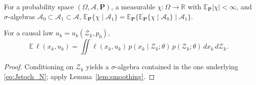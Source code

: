 \documentclass[twocolumn,amsthm]{autart}
\begin{document}
\begin{lem}\label{lem:smoothing}
For a probability space $(\Omega,\mathcal{A},\mathbf{P})$, a measurable
$\chi:\Omega\to\mathbb{R}$ with $\mathbb{E}_{\mathbf P}|\chi|<\infty$, and
$\sigma$-algebras $\mathcal{A}_0 \subset \mathcal{A}_1 \subset \mathcal{A}$,
$\mathbb{E}_{\mathbf P}\{\chi \mid \mathcal{A}_1\} =
\mathbb{E}_{\mathbf P}\{\mathbb{E}_{\mathbf P}\{\chi \mid \mathcal{A}_0\} \mid
\mathcal{A}_1\}$.
\end{lem}

\begin{lem}\label{lem:stagecost}
For a causal law $u_k = u_k(\mathcal{Z}_k, p_0)$,
\begin{equation*}
\mathbb{E}\,\ell(x_k,u_k) = \!\iint \ell(x_k,u_k)\,
p(x_k \mid \mathcal{Z}_k;\theta)\, p(\mathcal{Z}_k;\theta)\, dx_k\, d\mathcal{Z}_k.
\end{equation*}
\end{lem}
\begin{proof}
Conditioning on $\mathcal{Z}_k$ yields a $\sigma$-algebra contained in the one
underlying \eqref{eq:Jstoch_N}; apply Lemma~\ref{lem:smoothing}.
\end{proof}
\end{document}
